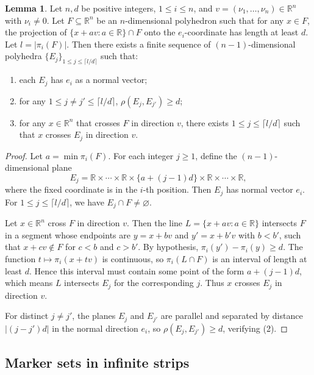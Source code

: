 \documentclass{amsart}
\theoremstyle{definition}
\newtheorem{lemma}[theorem]{Lemma}
\begin{document}
\begin{lemma}\label{lem:layer}
Let $n, d$ be positive integers, $1\leq i\leq n$, and
$v=(\nu_1,\dots,\nu_n)\in\mathbb{R}^n$ with $\nu_i\neq 0$.
Let $F\subseteq\mathbb{R}^n$ be an $n$-dimensional polyhedron such that for
any $x\in F$, the projection of $\{x+av\colon a\in\mathbb{R}\}\cap F$
onto the $e_i$-coordinate has length at least $d$. Let $l=|\pi_i(F)|$.
Then there exists a finite sequence of $(n-1)$-dimensional polyhedra
$\{E_j\}_{1\leq j\leq \lceil l/d\rceil}$ such that:
\begin{enumerate}
\item[(1)] each $E_j$ has $e_i$ as a normal vector;
\item[(2)] for any $1\leq j\neq j'\leq \lceil l/d\rceil$,
$\rho(E_j, E_{j'})\geq d$;
\item[(3)] for any $x\in\mathbb{R}^n$ that crosses $F$ in direction $v$,
there exists $1\leq j\leq \lceil l/d\rceil$ such that $x$ crosses $E_j$
in direction $v$.
\end{enumerate}
\end{lemma}

\begin{proof}
Let $a=\min\pi_i(F)$. For each integer $j\geq 1$, define the
$(n-1)$-dimensional plane
\[
E_j=\mathbb{R}\times\cdots\times\mathbb{R}\times\{a+(j-1)d\}
\times\mathbb{R}\times\cdots\times\mathbb{R},
\]
where the fixed coordinate is in the $i$-th position. Then $E_j$ has normal
vector $e_i$. For $1\leq j\leq \lceil l/d\rceil$, we have
$E_j\cap F\neq\varnothing$.

Let $x\in\mathbb{R}^n$ cross $F$ in direction $v$. Then the line
$L=\{x+av\colon a\in\mathbb{R}\}$ intersects $F$ in a segment whose
endpoints are $y=x+bv$ and $y'=x+b'v$ with $b<b'$, such that
$x+cv\notin F$ for $c<b$ and $c>b'$. By hypothesis,
$\pi_i(y')-\pi_i(y)\geq d$. The function $t\mapsto \pi_i(x+tv)$ is
continuous, so $\pi_i(L\cap F)$ is an interval of length at least $d$.
Hence this interval must contain some point of the form $a+(j-1)d$,
which means $L$ intersects $E_j$ for the corresponding $j$. Thus $x$
crosses $E_j$ in direction $v$.

For distinct $j\neq j'$, the planes $E_j$ and $E_{j'}$ are parallel and
separated by distance $|(j-j')d|$ in the normal direction $e_i$,
so $\rho(E_j, E_{j'})\geq d$, verifying (2).
\end{proof}

\subsection{Marker sets in infinite strips}
\end{document}
